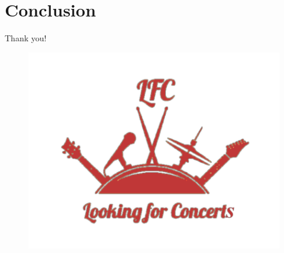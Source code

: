 \documentclass{beamer}
\begin{document}
\section
  {Conclusion}

\begin{frame}{Thank you!}
	\begin{figure}[t]
		\centering
		\includegraphics[height=\dimexpr6\textheight/16\relax]{images/logodark}
	\end{figure}
\end{frame}
\end{document}
